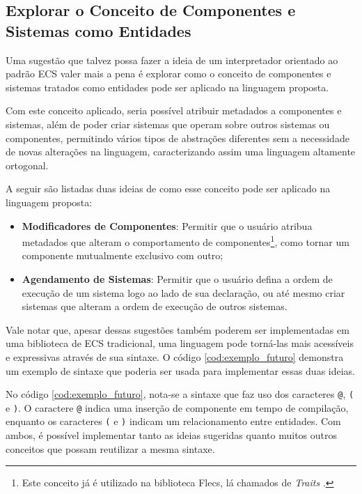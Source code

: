 \subsection{Explorar o Conceito de Componentes e Sistemas como Entidades}

Uma sugestão que talvez possa fazer a ideia de um interpretador orientado ao padrão ECS valer mais a pena é explorar como o conceito de componentes e sistemas tratados como entidades pode ser aplicado na linguagem proposta.

Com este conceito aplicado, seria possível atribuir metadados a componentes e sistemas, além de poder criar sistemas que operam sobre outros sistemas ou componentes, permitindo vários tipos de abstrações diferentes sem a necessidade de novas alterações na linguagem, caracterizando assim uma linguagem altamente ortogonal.

A seguir são listadas duas ideias de como esse conceito pode ser aplicado na linguagem proposta:

\begin{itemize}
    \item \textbf{Modificadores de Componentes}: Permitir que o usuário atribua metadados que alteram o comportamento de componentes\footnote{Este conceito já é utilizado na biblioteca Flecs, lá chamados de \textit{Traits} \cite{flecs}.}, como tornar um componente mutualmente exclusivo com outro;
    \item \textbf{Agendamento de Sistemas}: Permitir que o usuário defina a ordem de execução de um sistema logo ao lado de sua declaração, ou até mesmo criar sistemas que alteram a ordem de execução de outros sistemas.
\end{itemize}

Vale notar que, apesar dessas sugestões também poderem ser implementadas em uma biblioteca de ECS tradicional, uma linguagem pode torná-las mais acessíveis e expressivas através de sua sintaxe. O código \autoref{cod:exemplo_futuro} demonstra um exemplo de sintaxe que poderia ser usada para implementar essas duas ideias.

\codigoRust

\vspace{-1em}

No código \autoref{cod:exemplo_futuro}, nota-se a sintaxe que faz uso dos caracteres \texttt{@}, \texttt{(} e \texttt{)}. O caractere \texttt{@} indica uma inserção de componente em tempo de compilação, enquanto os caracteres \texttt{(} e \texttt{)} indicam um relacionamento entre entidades. Com ambos, é possível implementar tanto as ideias sugeridas quanto muitos outros conceitos que possam reutilizar a mesma sintaxe.

